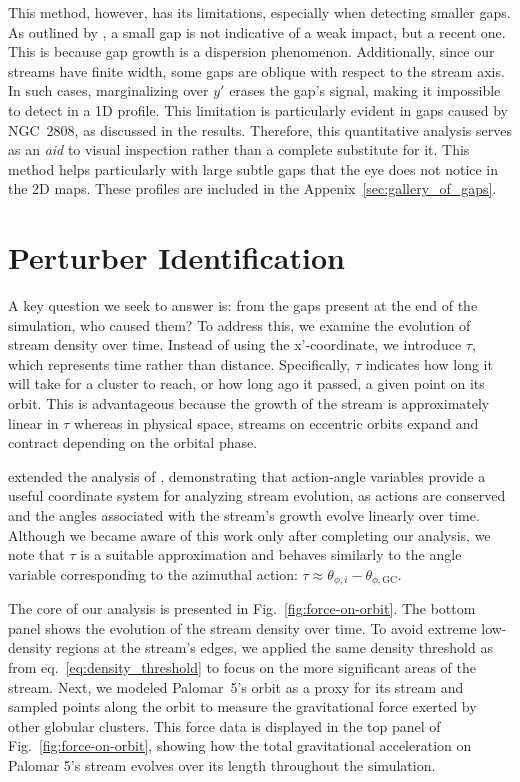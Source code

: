 \documentclass{aa}
\begin{document}
\begin{appendix}
    This method, however, has its limitations, especially when detecting smaller gaps. As outlined by \citet{2015MNRAS.450.1136E}, a small gap is not indicative of a weak impact, but a recent one. This is because gap growth is a dispersion phenomenon. Additionally, since our streams have finite width, some gaps are oblique with respect to the stream axis. In such cases, marginalizing over $y'$ erases the gap's signal, making it impossible to detect in a 1D profile. This limitation is particularly evident in gaps caused by NGC~2808, as discussed in the results. Therefore, this quantitative analysis serves as an \textit{aid} to visual inspection rather than a complete substitute for it. This method helps particularly with large subtle gaps that the eye does not notice in the 2D maps. These profiles are included in the Appenix~\ref{sec:gallery_of_gaps}.


    \section{Perturber Identification} \label{sec:Perturber_Identification}

      A key question we seek to answer is: from the gaps present at the end of the simulation, who caused them? To address this, we examine the evolution of stream density over time. Instead of using the x'-coordinate, we introduce $\tau$, which represents time rather than distance. Specifically, $\tau$ indicates how long it will take for a cluster to reach, or how long ago it passed, a given point on its orbit. This is advantageous because the growth of the stream is approximately linear in $\tau$ whereas in physical space, streams on eccentric orbits expand and contract depending on the orbital phase.


      \citet{2016MNRAS.457.3817S} extended the analysis of \citet{2015MNRAS.450.1136E}, demonstrating that action-angle variables provide a useful coordinate system for analyzing stream evolution, as actions are conserved and the angles associated with the stream's growth evolve linearly over time. Although we became aware of this work only after completing our analysis, we note that $\tau$ is a suitable approximation and behaves similarly to the angle variable corresponding to the azimuthal action: $\tau \approx \theta_{\phi,i} - \theta_{\phi,\text{GC}}$.

      The core of our analysis is presented in Fig.~\ref{fig:force-on-orbit}. The bottom panel shows the evolution of the stream density over time. To avoid extreme low-density regions at the stream's edges, we applied the same density threshold as from eq.~\ref{eq:density_threshold} to focus on the more significant areas of the stream. Next, we modeled Palomar~5's orbit as a proxy for its stream and sampled points along the orbit to measure the gravitational force exerted by other globular clusters. This force data is displayed in the top panel of Fig.~\ref{fig:force-on-orbit}, showing how the total gravitational acceleration on Palomar 5's stream evolves over its length throughout the simulation.


\end{appendix}
\end{document}
